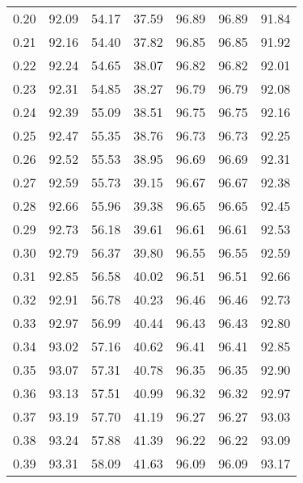 \begin{tabular}{|c|c|c|c|c|c|c|}
      0.20 &     92.09 &     54.17 &      37.59 &   96.89 &      96.89 &         91.84 \\
      0.21 &     92.16 &     54.40 &      37.82 &   96.85 &      96.85 &         91.92 \\
      0.22 &     92.24 &     54.65 &      38.07 &   96.82 &      96.82 &         92.01 \\
      0.23 &     92.31 &     54.85 &      38.27 &   96.79 &      96.79 &         92.08 \\
      0.24 &     92.39 &     55.09 &      38.51 &   96.75 &      96.75 &         92.16 \\
      0.25 &     92.47 &     55.35 &      38.76 &   96.73 &      96.73 &         92.25 \\
      0.26 &     92.52 &     55.53 &      38.95 &   96.69 &      96.69 &         92.31 \\
      0.27 &     92.59 &     55.73 &      39.15 &   96.67 &      96.67 &         92.38 \\
      0.28 &     92.66 &     55.96 &      39.38 &   96.65 &      96.65 &         92.45 \\
      0.29 &     92.73 &     56.18 &      39.61 &   96.61 &      96.61 &         92.53 \\
      0.30 &     92.79 &     56.37 &      39.80 &   96.55 &      96.55 &         92.59 \\
      0.31 &     92.85 &     56.58 &      40.02 &   96.51 &      96.51 &         92.66 \\
      0.32 &     92.91 &     56.78 &      40.23 &   96.46 &      96.46 &         92.73 \\
      0.33 &     92.97 &     56.99 &      40.44 &   96.43 &      96.43 &         92.80 \\
      0.34 &     93.02 &     57.16 &      40.62 &   96.41 &      96.41 &         92.85 \\
      0.35 &     93.07 &     57.31 &      40.78 &   96.35 &      96.35 &         92.90 \\
      0.36 &     93.13 &     57.51 &      40.99 &   96.32 &      96.32 &         92.97 \\
      0.37 &     93.19 &     57.70 &      41.19 &   96.27 &      96.27 &         93.03 \\
      0.38 &     93.24 &     57.88 &      41.39 &   96.22 &      96.22 &         93.09 \\
      0.39 &     93.31 &     58.09 &      41.63 &   96.09 &      96.09 &         93.17 \\

\end{tabular}
